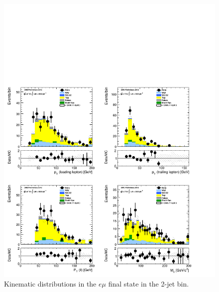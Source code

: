 \begin{figure}[!hbtp]
\centering
\includegraphics[width=1\textwidth]{figures/ww_analysis20_0_ALL_em_2j.pdf}
\caption{Kinematic distributions in the $e\mu$ final state in the 2-jet bin.}
\label{fig:xs_kinematics_em_2j}
\end{figure}
